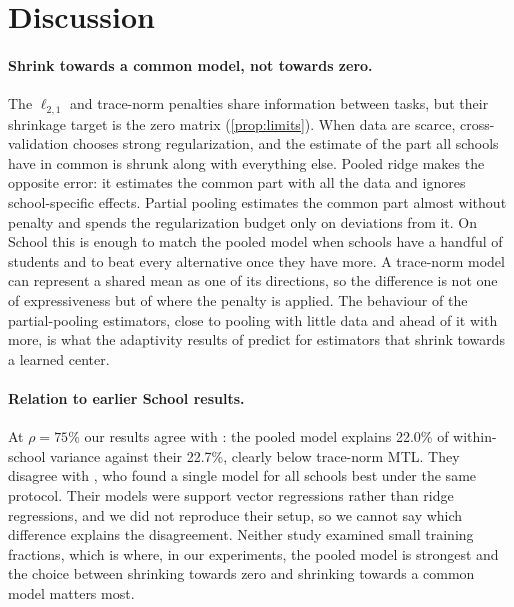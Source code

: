 \section{Discussion}
\label{sec:discussion}

\paragraph{Shrink towards a common model, not towards zero.}
The $\ell_{2,1}$ and trace-norm penalties share information between tasks, but their shrinkage target is the zero matrix (\cref{prop:limits}). When data are scarce, cross-validation chooses strong regularization, and the estimate of the part all schools have in common is shrunk along with everything else. Pooled ridge makes the opposite error: it estimates the common part with all the data and ignores school-specific effects. Partial pooling estimates the common part almost without penalty and spends the regularization budget only on deviations from it. On School this is enough to match the pooled model when schools have a handful of students and to beat every alternative once they have more. A trace-norm model can represent a shared mean as one of its directions, so the difference is not one of expressiveness but of where the penalty is applied. The behaviour of the partial-pooling estimators, close to pooling with little data and ahead of it with more, is what the adaptivity results of \citet{duan2023adaptive} predict for estimators that shrink towards a learned center.

\paragraph{Relation to earlier School results.}
At $\rho = 75\%$ our results agree with \citet{argyriou2008convex}: the pooled model explains 22.0\% of within-school variance against their 22.7\%, clearly below trace-norm MTL. They disagree with \citet{evgeniou2005kernel}, who found a single model for all schools best under the same protocol. Their models were support vector regressions rather than ridge regressions, and we did not reproduce their setup, so we cannot say which difference explains the disagreement. Neither study examined small training fractions, which is where, in our experiments, the pooled model is strongest and the choice between shrinking towards zero and shrinking towards a common model matters most.

